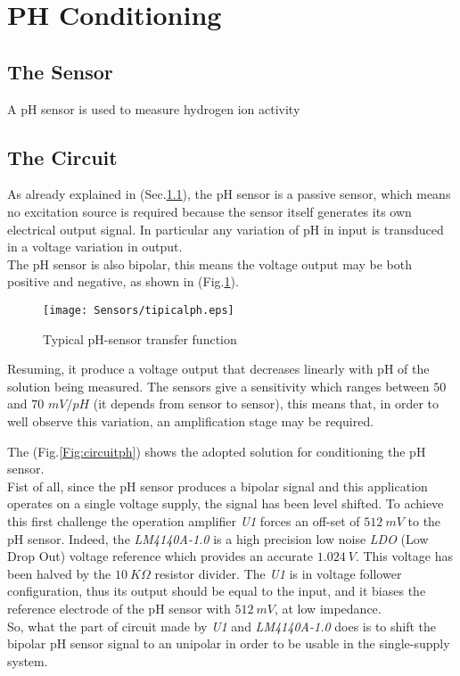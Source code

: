 \section{PH Conditioning}

\subsection{The Sensor}\label{sec:sensorPH}
A pH sensor is used to measure hydrogen ion activity 

\subsection{The Circuit}\label{sec:circuitPH}
As already explained in (Sec.\ref{sec:sensorPH}), the pH sensor is a passive sensor, which means no excitation source is required because the sensor itself generates its own electrical output signal. In particular any variation of pH in input is transduced in a voltage variation in output.\\

The pH sensor is also bipolar, this means the voltage output may be both positive and negative, as shown in (Fig.\ref{Fig:typicalph}).\\

\begin{figure}[h]
	\centering
	\texttt{[image: Sensors/tipicalph.eps]}
	\caption{Typical pH-sensor transfer function}
	\label{Fig:typicalph}
	
\end{figure}

Resuming, it produce a voltage output that decreases linearly with pH of the solution being measured. The sensors give a sensitivity which ranges between $50$ and $70$ $mV/pH$ (it depends from sensor to sensor), this means that, in order to well observe this variation, an amplification stage may be required.

The (Fig.\ref{Fig:circuitph}) shows the adopted solution for conditioning the pH sensor. \\
Fist of all, since the pH sensor produces a bipolar signal and this application operates on a single voltage supply, the signal has been level shifted. To achieve this first challenge the operation amplifier \textit{U1} forces an off-set of $512\ mV$ to the pH sensor. Indeed, the \textit{LM4140A-1.0} is a high precision low noise \textit{LDO} (Low Drop Out) voltage reference which provides an accurate $1.024\ V$. This voltage has been halved by the $10\ K\Omega$ resistor divider. The \textit{U1} is in voltage follower configuration, thus its output should be equal to the input, and it biases the reference electrode of the pH sensor with $512\ mV$, at low impedance.\\
So, what the part of circuit made by \textit{U1} and \textit{LM4140A-1.0} does is to shift the bipolar pH sensor signal to an unipolar in order to be usable in the single-supply system.
 
